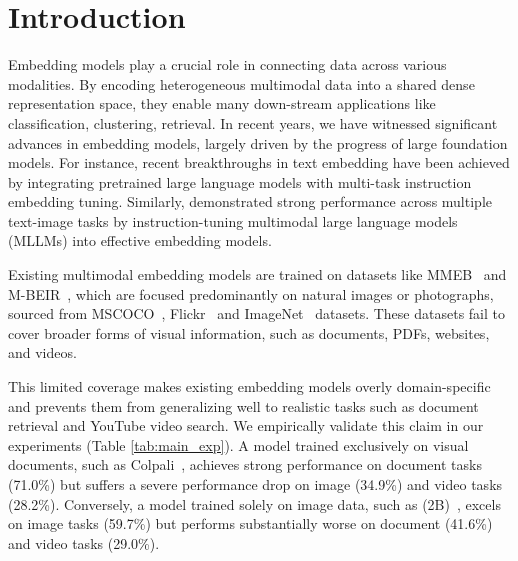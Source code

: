 \section{Introduction}
Embedding models play a crucial role in connecting data across various modalities. By encoding heterogeneous multimodal data into a shared dense representation space, they enable many down-stream applications like classification, clustering, retrieval. In recent years, we have witnessed significant advances in embedding models, largely driven by the progress of large foundation models. For instance, recent breakthroughs in text embedding \citep{instructor,e5mistral, SFRembedding,LLM2Vec} have been achieved by integrating pretrained large language models with multi-task instruction embedding tuning. Similarly, \citet{vlm2vec,gme, chen-etal-2025-seeing} demonstrated strong performance across multiple text-image tasks by instruction-tuning multimodal large language models (MLLMs) into effective embedding models.


Existing multimodal embedding models are trained on datasets like MMEB~\citep{vlm2vec} and M-BEIR~\citep{uniir}, which are focused predominantly on natural images or photographs, sourced from MSCOCO~\citep{mscoco}, Flickr~\citep{flickr30k} and ImageNet~\citep{imagenet} datasets. These datasets fail to cover broader forms of visual information, such as documents, PDFs, websites, and videos. 

This limited coverage makes existing embedding models overly domain-specific and prevents them from generalizing well to realistic tasks such as document retrieval and YouTube video search. We empirically validate this claim in our experiments (Table \ref{tab:main_exp}). A model trained exclusively on visual documents, such as Colpali~\citep{colpali}, achieves strong performance on document tasks (71.0\%) but suffers a severe performance drop on image (34.9\%) and video tasks (28.2\%). Conversely, a model trained solely on image data, such as \vlmvec (2B)~\citep{vlm2vec}, excels on image tasks (59.7\%) but performs substantially worse on document (41.6\%) and video tasks (29.0\%).


